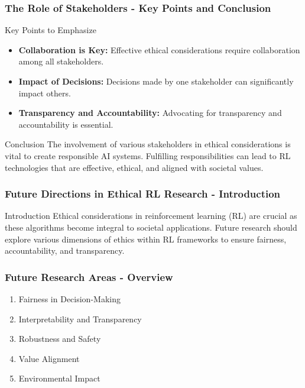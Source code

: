 \documentclass[aspectratio=169]{beamer}
\begin{document}
\begin{frame}[fragile]
    \frametitle{The Role of Stakeholders - Key Points and Conclusion}
    \begin{block}{Key Points to Emphasize}
        \begin{itemize}
            \item \textbf{Collaboration is Key:} Effective ethical considerations require collaboration among all stakeholders. 
            \item \textbf{Impact of Decisions:} Decisions made by one stakeholder can significantly impact others.
            \item \textbf{Transparency and Accountability:} Advocating for transparency and accountability is essential.
        \end{itemize}
    \end{block}
    
    \begin{block}{Conclusion}
        The involvement of various stakeholders in ethical considerations is vital to create responsible AI systems. 
        Fulfilling responsibilities can lead to RL technologies that are effective, ethical, and aligned with societal values.
    \end{block}
\end{frame}

\begin{frame}[fragile]
  \frametitle{Future Directions in Ethical RL Research - Introduction}
  
  \begin{block}{Introduction}
    Ethical considerations in reinforcement learning (RL) are crucial as these algorithms become integral to societal applications. 
    Future research should explore various dimensions of ethics within RL frameworks to ensure fairness, accountability, and transparency.
  \end{block}
\end{frame}

\begin{frame}[fragile]
  \frametitle{Future Research Areas - Overview}
  
  \begin{enumerate}
    \item Fairness in Decision-Making
    \item Interpretability and Transparency
    \item Robustness and Safety
    \item Value Alignment
    \item Environmental Impact
  \end{enumerate}

\end{frame}
\end{document}
